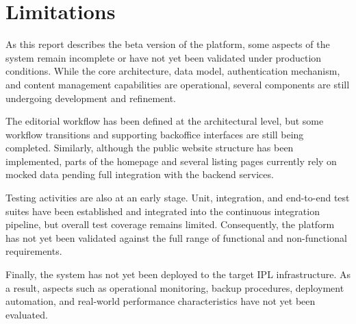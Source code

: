 \section{Limitations}

As this report describes the beta version of the platform, some aspects of the
system remain incomplete or have not yet been validated under production
conditions. While the core architecture, data model, authentication mechanism,
and content management capabilities are operational, several components are
still undergoing development and refinement.

The editorial workflow has been defined at the architectural level, but
some workflow transitions and supporting backoffice interfaces are still being
completed. Similarly, although the public website structure has been
implemented, parts of the homepage and several listing pages currently rely on
mocked data pending full integration with the backend services.

Testing activities are also at an early stage. Unit, integration, and
end-to-end test suites have been established and integrated into the continuous
integration pipeline, but overall test coverage remains limited. Consequently,
the platform has not yet been validated against the full range of functional
and non-functional requirements.

Finally, the system has not yet been deployed to the target IPL
infrastructure. As a result, aspects such as operational monitoring, backup
procedures, deployment automation, and real-world performance characteristics
have not yet been evaluated.
